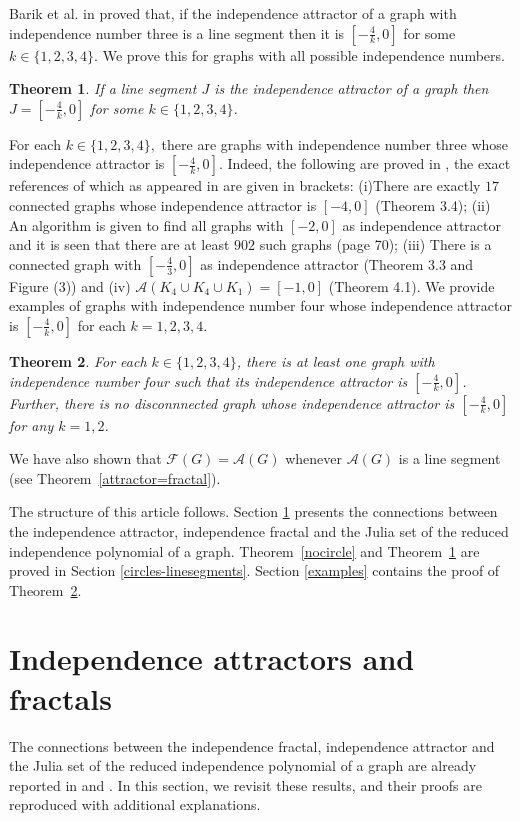 \documentclass[12pt,a4paper]{article}
\theoremstyle{plain}
\newtheorem{maintheorem}{Theorem}
\numberwithin{equation}{section}
\begin{document}
 Barik et al. in \cite{tk-barik-20}  
proved that, if the  independence attractor of a graph with independence number three is a line segment then it is $[-\frac{4}{k},0]$ for some  $k \in \{1,2,3,4\}$.  We prove this for graphs with all possible independence numbers.
\begin{maintheorem}
	\label{linesegment}
	If a line segment $J$ is the independence attractor of a graph then   $J= [-\frac{4}{k}, 0]$ for some $k \in \{1, 2, 3, 4\}$. 
\end{maintheorem}
For each $k \in \{1,2,3,4\}, $ there are graphs with independence number three whose independence attractor is $[-\frac{4}{k},0]$.  Indeed, the following are proved in \cite{tk-barik-20}, the exact references of which as appeared in \cite{tk-barik-20}  are given in brackets: (i)There are exactly $17$ connected graphs whose independence attractor is $[-4,0]$ (Theorem 3.4); (ii) An algorithm is given to find all graphs with $[-2,0]$ as independence attractor and it is seen that there are at least $902$ such graphs (page 70); (iii) There is a connected graph with $[-\frac{4}{3},0]$ as independence attractor (Theorem 3.3 and Figure (3)) and (iv)  $\mathcal{A}(K_4 \cup K_4 \cup K_1)= [-1,0]$ (Theorem 4.1).  We provide examples of graphs with independence number four whose independence attractor is $[-\frac{4}{k},0]$ for each $k=1,2,3,4$.
\begin{maintheorem}
	For each $k\in \{1,2,3,4\}$, there is at least one graph with independence number four such that its independence attractor is $[-\frac{4}{k}, 0]$. Further, there is no disconnnected graph whose independence attractor is $[-\frac{4}{k}, 0]$ for any $k=1,2$. 
	\label{exampls-ind-no-4}
	\end{maintheorem}

 We have also shown  that $\mathcal{F}(G) =\mathcal{A}(G) $ whenever $\mathcal{A}(G)$ is a line segment (see Theorem~\ref{attractor=fractal}). 
 \par  
The structure of this article follows. Section \ref{ind-attractor-fractal} presents the connections between the independence attractor, independence fractal and the Julia set of the reduced independence polynomial of a graph. Theorem~\ref{nocircle} and Theorem~\ref{linesegment} are proved in Section \ref{circles-linesegments}. Section \ref{examples} contains the proof of Theorem~\ref{exampls-ind-no-4}.
\section{Independence attractors and fractals}
\label{ind-attractor-fractal}
The connections between the independence fractal, independence attractor and the Julia set of the reduced independence polynomial of a graph are already reported in \cite{brownetal2003} and  \cite{hickman2001}. In this section, we revisit these results, and  their proofs are reproduced with additional explanations. 
\end{document}
